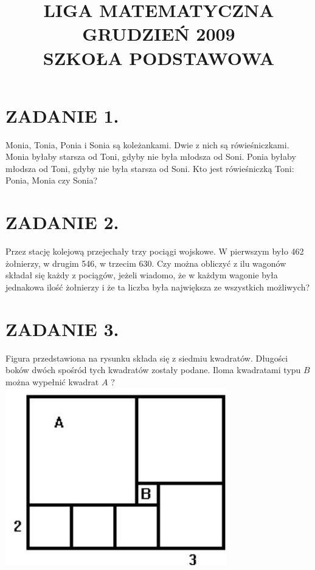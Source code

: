 \documentclass[10pt]{article}
\title{LIGA MATEMATYCZNA \\
 GRUDZIEŃ 2009 \\
 SZKOŁA PODSTAWOWA }
\author{}
\date{}
\begin{document}
\maketitle
\section*{ZADANIE 1.}
Monia, Tonia, Ponia i Sonia są koleżankami. Dwie z nich są rówieśniczkami. Monia byłaby starsza od Toni, gdyby nie była młodsza od Soni. Ponia byłaby młodsza od Toni, gdyby nie była starsza od Soni. Kto jest rówieśniczką Toni: Ponia, Monia czy Sonia?

\section*{ZADANIE 2.}
Przez stację kolejową przejechały trzy pociągi wojskowe. W pierwszym było 462 żołnierzy, w drugim 546, w trzecim 630. Czy można obliczyć z ilu wagonów składał się każdy z pociągów, jeżeli wiadomo, że w każdym wagonie była jednakowa ilość żołnierzy i że ta liczba była największa ze wszystkich możliwych?

\section*{ZADANIE 3.}
Figura przedstawiona na rysunku składa się z siedmiu kwadratów. Długości boków dwóch spośród tych kwadratów zostały podane. Iloma kwadratami typu \(B\) można wypełnić kwadrat \(A\) ?\\
\includegraphics[max width=\textwidth, center]{2024_11_21_5747135af9543a0e0c7fg-1(1)}
\end{document}
